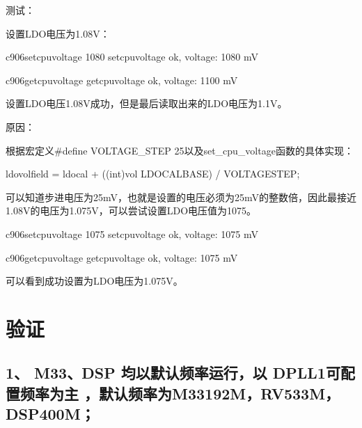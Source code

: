 \documentclass[letterpaper,10pt,english]{sphinxmanual}
\begin{document}
\sphinxAtStartPar
测试：

\sphinxAtStartPar
设置LDO电压为1.08V：

\begin{sphinxVerbatim}[commandchars=\\\{\}]
c906\PYGZgt{}set\PYGZus{}cpu\PYGZus{}voltage 1080
set\PYGZus{}cpu\PYGZus{}voltage ok, voltage: 1080 mV

c906\PYGZgt{}get\PYGZus{}cpu\PYGZus{}voltage
get\PYGZus{}cpu\PYGZus{}voltage ok, voltage: 1100 mV 
\end{sphinxVerbatim}

\sphinxAtStartPar
设置LDO电压1.08V成功，但是最后读取出来的LDO电压为1.1V。

\sphinxAtStartPar
原因：

\sphinxAtStartPar
根据宏定义\#define VOLTAGE\_STEP 25以及set\_cpu\_voltage函数的具体实现：

\begin{sphinxVerbatim}[commandchars=\\\{\}]
ldo\PYGZus{}vol\PYGZus{}field = ldo\PYGZus{}cal + ((int)vol \PYGZhy{} LDO\PYGZus{}CAL\PYGZus{}BASE) / VOLTAGE\PYGZus{}STEP;
\end{sphinxVerbatim}

\sphinxAtStartPar
可以知道步进电压为25mV，也就是设置的电压必须为25mV的整数倍，因此最接近1.08V的电压为1.075V，可以尝试设置LDO电压值为1075。

\begin{sphinxVerbatim}[commandchars=\\\{\}]
c906\PYGZgt{}set\PYGZus{}cpu\PYGZus{}voltage 1075
set\PYGZus{}cpu\PYGZus{}voltage ok, voltage: 1075 mV

c906\PYGZgt{}get\PYGZus{}cpu\PYGZus{}voltage
get\PYGZus{}cpu\PYGZus{}voltage ok, voltage: 1075 mV
\end{sphinxVerbatim}

\sphinxAtStartPar
可以看到成功设置为LDO电压为1.075V。


\chapter{验证}
\label{\detokenize{r128_u9a8c_u8bc1_u56fa_u4ef6/r128_u9a8c_u8bc1_u56fa_u4ef6_u5f00_u53d1_u6307_u5357:id1}}

\section{1、 M33、DSP 均以默认频率运行，以 DPLL1可配置频率为主 ，默认频率为M33\sphinxhyphen{}192M，RV\sphinxhyphen{}533M，DSP\sphinxhyphen{}400M；}
\label{\detokenize{r128_u9a8c_u8bc1_u56fa_u4ef6/r128_u9a8c_u8bc1_u56fa_u4ef6_u5f00_u53d1_u6307_u5357:id2}}
\sphinxAtStartPar
{}
\end{document}
